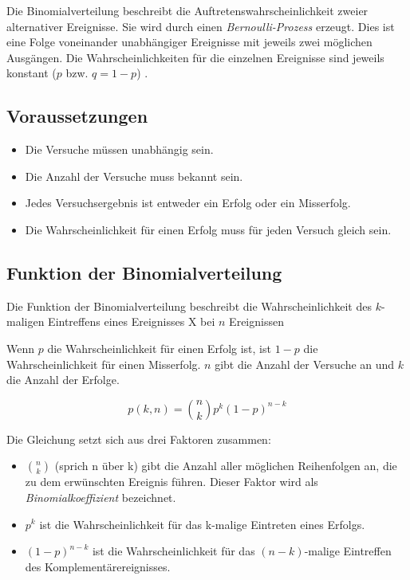 \documentclass[
]{book}
\providecommand{\tightlist}{%
  \setlength{\itemsep}{0pt}\setlength{\parskip}{0pt}}
\begin{document}
Die Binomialverteilung beschreibt die Auftretenswahrscheinlichkeit zweier alternativer Ereignisse. Sie wird durch einen \emph{Bernoulli-Prozess} erzeugt. Dies ist eine Folge voneinander unabhängiger Ereignisse mit jeweils zwei möglichen Ausgängen. Die Wahrscheinlichkeiten für die einzelnen Ereignisse sind jeweils konstant (\(p\) bzw. \(q = 1 - p\)) \citep{Leonhart2013}.

\hypertarget{voraussetzungen}{%
\subsection{Voraussetzungen}\label{voraussetzungen}}

\begin{itemize}
\tightlist
\item
  Die Versuche müssen unabhängig sein.\\
\item
  Die Anzahl der Versuche muss bekannt sein.\\
\item
  Jedes Versuchsergebnis ist entweder ein Erfolg oder ein Misserfolg.\\
\item
  Die Wahrscheinlichkeit für einen Erfolg muss für jeden Versuch gleich sein.
\end{itemize}

\hypertarget{funktion-der-binomialverteilung}{%
\subsection{Funktion der Binomialverteilung}\label{funktion-der-binomialverteilung}}

Die Funktion der Binomialverteilung beschreibt die Wahrscheinlichkeit des \(k\)-maligen Eintreffens eines Ereignisses X bei \(n\) Ereignissen

Wenn \(p\) die Wahrscheinlichkeit für einen Erfolg ist, ist \(1-p\) die Wahrscheinlichkeit für einen Misserfolg. \(n\) gibt die Anzahl der Versuche an und \(k\) die Anzahl der Erfolge.

\begin{equation}
  p(k, n) =  {n \choose k}p^k(1-p)^{n-k}
  \label{eq:binom}
\end{equation}

Die Gleichung setzt sich aus drei Faktoren zusammen:

\begin{itemize}
\tightlist
\item
  \(n \choose k\) (sprich n über k) gibt die Anzahl aller möglichen Reihenfolgen an,
  die zu dem erwünschten Ereignis führen. Dieser Faktor wird als \emph{Binomialkoeffizient} bezeichnet.\\
\item
  \(p^k\) ist die Wahrscheinlichkeit für das k-malige Eintreten eines Erfolgs.\\
\item
  \((1-p)^{n-k}\) ist die Wahrscheinlichkeit für das \((n-k)\)-malige Eintreffen des Komplementärereignisses.
\end{itemize}
\end{document}
